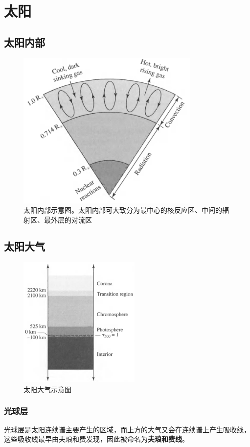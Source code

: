 
\chapter{太阳}
\section{太阳内部}
\begin{figure}[hbt]
  \centering
  \includegraphics[width=9cm]{chapters/11/interior}
  \caption{太阳内部示意图。太阳内部可大致分为最中心的核反应区、中间的辐射区、最外层的对流区}
  \label{}
\end{figure}

\section{太阳大气}
\begin{figure}[hbt]
  \centering
  \includegraphics[width=6cm]{chapters/11/atmosphere}
  \caption{太阳大气示意图}
  \label{}
\end{figure}

\subsection{光球层}
光球层是太阳连续谱主要产生的区域，而上方的大气又会在连续谱上产生吸收线，这些吸收线最早由夫琅和费发现，因此被命名为\textbf{夫琅和费线}。

